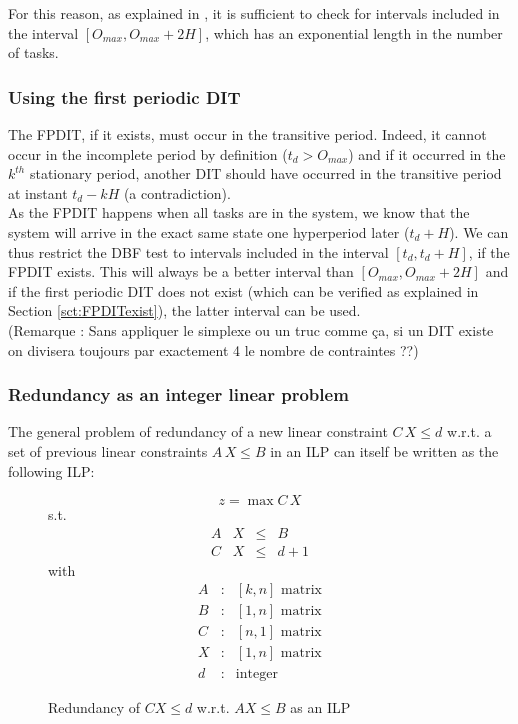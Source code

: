 \documentclass[times, 10pt,twocolumn, a4paper]{article}
\begin{document}
For this reason, as explained in \cite{leung1982complexity}, it is sufficient to check for intervals included in the interval $[O_{max}, O_{max} + 2H]$, which has an exponential length in the number of tasks.

\subsubsection{Using the first periodic DIT}

The FPDIT, if it exists, must occur in the transitive period. Indeed, it cannot occur in the incomplete period by definition ($t_d > O_{max}$) and if it occurred in the $k^{th}$ stationary period, another DIT should have occurred in the transitive period at instant $t_d - k H$ (a contradiction).\\

As the FPDIT happens when all tasks are in the system, we know that the system will arrive in the exact same state one hyperperiod later ($t_d + H$). We can thus restrict the DBF test to intervals included in the interval $[t_d, t_d + H]$, if the FPDIT exists. This will always be a better interval than $[O_{max}, O_{max} + 2H]$ and if the first periodic DIT does not exist (which can be verified as explained in Section \ref{sct:FPDITexist}), the latter interval can be used.\\

(Remarque : Sans appliquer le simplexe ou un truc comme ça, si un DIT existe on divisera toujours par exactement 4 le nombre de contraintes ??)

\subsubsection{Redundancy as an integer linear problem}

The general problem of redundancy of a new linear constraint $C \, X \leq d$ w.r.t. a set of previous linear constraints $A \, X \leq B$ in an ILP can itself be written as the following ILP:

\begin{figure}[h]
$$z = \max C \, X$$
s.t.
\[
\begin{array}{rccc}
	A & X &\leq & B \\
	C & X &\leq & d + 1
\end{array}
\]
with
\[
	\begin{array}{ccc}
		A & : & [k,n] \text{ matrix}\\
		B & : & [1,n] \text{ matrix}\\
		C & : & [n,1] \text{ matrix}\\
		X & : & [1,n] \text{ matrix}\\
		d & : & \text{integer}
	\end{array}
\]
\caption{Redundancy of $CX \leq d$ w.r.t. $A X \leq B$ as an ILP}
\end{figure}
\end{document}
